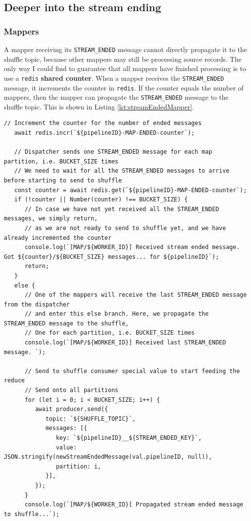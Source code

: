 \subsection{Deeper into the stream ending}

\subsubsection{Mappers}
A mapper receiving its \verb|STREAM_ENDED| message cannot directly propagate it to the shuffle topic, because other mappers may still be processing source records.
The only way I could find to guarantee that all mappers have finished processing is to use a \texttt{redis} \textbf{shared counter}.
When a mapper receives the \verb|STREAM_ENDED| message, it increments the counter in \texttt{redis}.
If the counter equals the number of mappers, then the mapper can propagate the \verb|STREAM_ENDED| message to the shuffle topic.
This is shown in Listing \ref{lst:streamEndedMapper}.

\begin{lstlisting}[label={lst:streamEndedMapper}, caption={Handling the STREAM\_ENDED message in a mapper},captionpos={top}]
   // Increment the counter for the number of ended messages
   await redis.incr(`${pipelineID}-MAP-ENDED-counter`);
   
   // Dispatcher sends one STREAM_ENDED message for each map partition, i.e. BUCKET_SIZE times
   // We need to wait for all the STREAM_ENDED messages to arrive before starting to send to shuffle
   const counter = await redis.get(`${pipelineID}-MAP-ENDED-counter`);
   if (!counter || Number(counter) !== BUCKET_SIZE) {
      // In case we have not yet received all the STREAM_ENDED messages, we simply return,
      // as we are not ready to send to shuffle yet, and we have already incremented the counter
      console.log(`[MAP/${WORKER_ID}] Received stream ended message. Got ${counter}/${BUCKET_SIZE} messages... for ${pipelineID}`);
      return;
   }
   else {
      // One of the mappers will receive the last STREAM_ENDED message from the dispatcher
      // and enter this else branch. Here, we propagate the STREAM_ENDED message to the shuffle,
      // One for each partition, i.e. BUCKET_SIZE times
      console.log(`[MAP/${WORKER_ID}] Received last STREAM_ENDED message. `);
   
      // Send to shuffle consumer special value to start feeding the reduce
      // Send onto all partitions
      for (let i = 0; i < BUCKET_SIZE; i++) {
         await producer.send({
            topic: `${SHUFFLE_TOPIC}`,
            messages: [{
               key: `${pipelineID}__${STREAM_ENDED_KEY}`,
               value: JSON.stringify(newStreamEndedMessage(val.pipelineID, null)),
               partition: i,
            }],
         });
      }
      console.log(`[MAP/${WORKER_ID}] Propagated stream ended message to shuffle...`);
\end{lstlisting}


